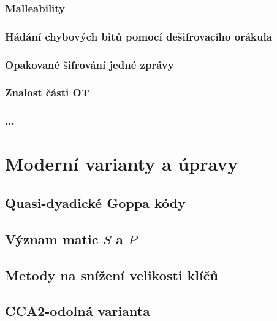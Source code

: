 \documentclass[thesis=M,czech,hidelinks]{FITthesis}[2012/06/26]
\newcommand{\0}{{\textcolor[gray]{0.80}{0}}}
\begin{document}
\subsubsection{Malleability}

\subsubsection{Hádání chybových bitů pomocí dešifrovacího orákula}

\subsubsection{Opakované šifrování jedné zprávy}

\subsubsection{Znalost části OT}

\subsubsection{...}



\section{Moderní varianty a úpravy}
\subsection{Quasi-dyadické Goppa kódy}
\subsection{Význam matic $S$ a $P$}
\subsection{Metody na snížení velikosti klíčů}\label{kap_snizeni_velikosti_klicu}
\subsection{CCA2-odolná varianta}
\end{document}
